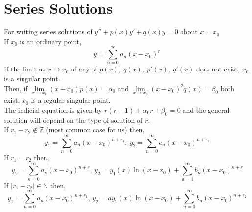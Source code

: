 \documentclass[11pt, fleqn]{article}
\newcommand{\<}{\langle}
\renewcommand{\>}{\rangle}
\newcommand{\Z}{\mathds{Z}}
\begin{document}
\section*{Series Solutions}
For writing series solutions of $y''+p(x)y'+q(x)y=0$ about $x=x_0$\\
If $x_0$ is an ordinary point,
$$y=\sum_{n=0}^\infty a_n (x-x_0)^n$$
If the limit as $x\to x_0$ of any of $p(x),\ q(x),\ p'(x),\ q'(x)$ does not exist, $x_0$ is a singular point.\\
Then, if $\lim\limits_{x\to x_0}(x-x_0)p(x)=\alpha_0$ and $\lim\limits_{x\to x_0}(x-x_0)^2q(x)=\beta_0$ both exist, $x_0$ is a regular singular point.\\
The indicial equation is given by $r(r-1)+\alpha_0r+\beta_0=0$ and the general solution will depend on the type of solution of $r$.\\
If $r_1-r_2\not\in\Z$ (most common case for us) then,
$$y_1=\sum_{n=0}^\infty a_n(x-x_0)^{n+r_1},\ y_2=\sum_{n=0}^\infty a_n (x-x_0)^{n+r_2}$$
If $r_1=r_2$ then,
$$y_1=\sum_{n=0}^\infty a_n(x-x_0)^{n+r},\ y_2=y_1(x)\ln(x-x_0)+\sum_{n=1}^\infty b_n(x-x_0)^{n+r}$$
If $|r_1-r_2|\in\mathbb{N}$ then,
$$y_1=\sum_{n=0}^\infty a_n(x-x_0)^{n+r_1},\ y_2=ay_1(x)\ln(x-x_0)+\sum_{n=0}^\infty b_n(x-x_0)^{n+r_2}$$
\end{document}
